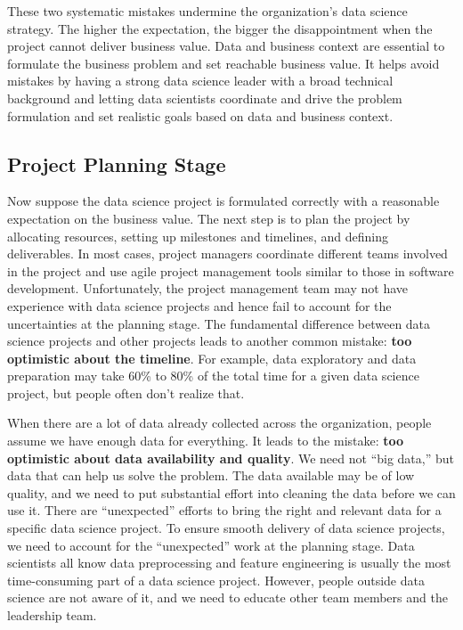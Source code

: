 \documentclass[
  12pt,
]{krantz}
\begin{document}
These two systematic mistakes undermine the organization's data science strategy. The higher the expectation, the bigger the disappointment when the project cannot deliver business value. Data and business context are essential to formulate the business problem and set reachable business value. It helps avoid mistakes by having a strong data science leader with a broad technical background and letting data scientists coordinate and drive the problem formulation and set realistic goals based on data and business context.

\hypertarget{project-planning-stage}{%
\subsection{Project Planning Stage}\label{project-planning-stage}}

Now suppose the data science project is formulated correctly with a reasonable expectation on the business value. The next step is to plan the project by allocating resources, setting up milestones and timelines, and defining deliverables. In most cases, project managers coordinate different teams involved in the project and use agile project management tools similar to those in software development. Unfortunately, the project management team may not have experience with data science projects and hence fail to account for the uncertainties at the planning stage. The fundamental difference between data science projects and other projects leads to another common mistake: \textbf{too optimistic about the timeline}. For example, data exploratory and data preparation may take 60\% to 80\% of the total time for a given data science project, but people often don't realize that.

When there are a lot of data already collected across the organization, people assume we have enough data for everything. It leads to the mistake: \textbf{too optimistic about data availability and quality}. We need not ``big data,'' but data that can help us solve the problem. The data available may be of low quality, and we need to put substantial effort into cleaning the data before we can use it. There are ``unexpected'' efforts to bring the right and relevant data for a specific data science project. To ensure smooth delivery of data science projects, we need to account for the ``unexpected'' work at the planning stage. Data scientists all know data preprocessing and feature engineering is usually the most time-consuming part of a data science project. However, people outside data science are not aware of it, and we need to educate other team members and the leadership team.
\end{document}
